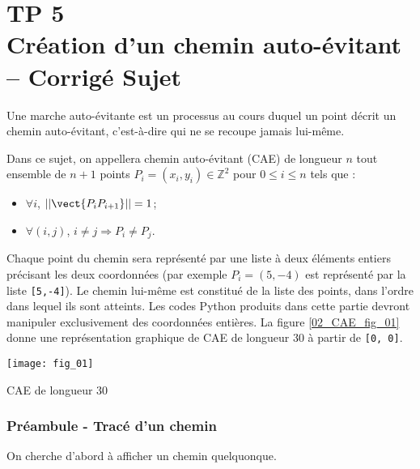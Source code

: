 \chapter*{TP 5 \\ 
Création d'un chemin auto-évitant -- \ifprof Corrigé \else Sujet \fi}

\iflivret {} \else
\ifprof  {} \else \fi
\fi

\setcounter{question}{0}
Une marche auto-évitante est un processus au cours duquel un point décrit un chemin auto-évitant, c’est-à-dire qui ne se recoupe jamais lui-même. 

Dans ce sujet, on appellera chemin auto-évitant (CAE) de longueur $n$ tout ensemble de $n+1$ points $P_i = \left(x_i,y_i\right)\in \mathbb{Z}^2$ pour $0 \leq i \leq n$ tels que :
\begin{itemize}[label=$\blacktriangleright$]
\item $\forall i$, $||\vect{P_i P_{i + 1}}|| = 1$;
\item $\forall (i,j)$, $i\neq j \Rightarrow P_i \neq P_j$.
\end{itemize}



Chaque point du chemin sera représenté par une liste à deux éléments entiers précisant les deux coordonnées
(par exemple $P_i = \left(5, -4\right)$ est représenté par la liste \lstinline{[5,-4]}). Le chemin lui-même est constitué de la liste des points, dans l’ordre dans lequel ils sont atteints. Les codes Python produits dans cette partie devront manipuler exclusivement des coordonnées entières.
La figure \ref{02_CAE_fig_01} donne une représentation graphique de CAE de longueur 30 à partir de \lstinline{[0, 0]}.

\begin{marginfigure}
\texttt{[image: fig\_01]}
\caption{CAE de longueur 30\label{02_CAE_fig_01}}
\end{marginfigure}

\subsection*{Préambule - Tracé d'un chemin} 

On cherche d'abord à afficher un chemin quelquonque. 

